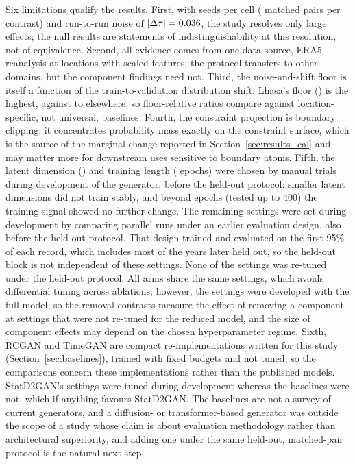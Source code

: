 \documentclass[preprint,12pt]{elsarticle}
\newcommand{\abs}[1]{\left| #1 \right|}
\begin{document}
Six limitations qualify the results.  First, with \nSeeds{} seeds per cell
(\nPairs{} matched pairs per contrast)
and run-to-run noise of $\abs{\Delta\tau} = \runNoiseDtau$, the study
resolves only large effects; the null results are statements of
indistinguishability at this resolution, not of equivalence.  Second,
all evidence comes from one data source, ERA5 reanalysis at
\nLocsProtoWord{} locations with \protoNScaledWord{} scaled
features; the protocol transfers to other domains, but the component
findings need not.  Third, the noise-and-shift floor is itself a function of the
train-to-validation distribution shift: Lhasa's floor (\ksFloorLhasa) is
the highest, against \ksFloorDubai{} to \ksFloorYakutsk{} elsewhere, so
floor-relative ratios compare against location-specific, not universal,
baselines.  Fourth, the constraint projection is boundary clipping; it
concentrates probability mass exactly on the constraint surface, which
is the source of the marginal change reported in
Section~\ref{sec:results_cal} and may matter more for downstream
uses sensitive to boundary atoms.  Fifth, the latent dimension (\protoLatent{}) and training length
(\protoEpochs{} epochs) were chosen by manual trials during development of
the generator, before the held-out protocol: smaller latent dimensions did
not train stably, and beyond \protoEpochs{} epochs (tested up to 400) the
training signal showed no further change. The remaining settings were set
during development by comparing parallel runs under an earlier evaluation
design, also before the held-out protocol. That design trained and
evaluated on the first 95\% of each record, which includes most of the
years later held out, so the held-out block is not independent of these
settings. None of the settings was re-tuned under the held-out protocol. All arms share
the same settings, which avoids differential tuning across ablations; however,
the settings were developed with the full model, so the removal contrasts
measure the effect of removing a component at settings that were not re-tuned
for the reduced model, and the size of component effects may depend on the
chosen hyperparameter regime. Sixth, RCGAN and TimeGAN are
compact re-implementations written for this study
(Section~\ref{sec:baselines}), trained with fixed budgets and not tuned,
so the comparisons concern these implementations rather than the
published models. StatD2GAN's settings were tuned during development
whereas the baselines were not, which if anything favours StatD2GAN.
The baselines are not a survey of current generators, and a
diffusion- or transformer-based generator was outside the scope of a
study whose claim is about evaluation methodology rather than
architectural superiority, and adding one under the same held-out,
matched-pair protocol is the natural next step.
\end{document}
